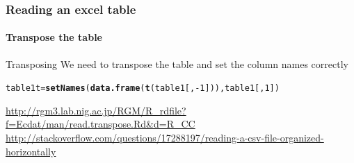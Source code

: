 \documentclass[10pt,handout,english]{beamer}\usepackage[]{graphicx}\usepackage[]{color}
\makeatletter
\newcommand{\hlnum}[1]{\textcolor[rgb]{0.686,0.059,0.569}{#1}}%
\newcommand{\hlopt}[1]{\textcolor[rgb]{0,0,0}{#1}}%
\newcommand{\hlstd}[1]{\textcolor[rgb]{0.345,0.345,0.345}{#1}}%
\newcommand{\hlkwb}[1]{\textcolor[rgb]{0.69,0.353,0.396}{#1}}%
\newcommand{\hlkwd}[1]{\textcolor[rgb]{0.737,0.353,0.396}{\textbf{#1}}}%
\newenvironment{kframe}{%
 \def\at@end@of@kframe{}%
 \ifinner\ifhmode%
  \def\at@end@of@kframe{\end{minipage}}%
  \begin{minipage}{\columnwidth}%
 \fi\fi%
 \def\FrameCommand##1{\hskip\@totalleftmargin \hskip-\fboxsep
 \colorbox{shadecolor}{##1}\hskip-\fboxsep
     \hskip-\linewidth \hskip-\@totalleftmargin \hskip\columnwidth}%
 \MakeFramed {\advance\hsize-\width
   \@totalleftmargin\z@ \linewidth\hsize
   \@setminipage}}%
 {\par\unskip\endMakeFramed%
 \at@end@of@kframe}
\newenvironment{knitrout}{}{} %
\makeatother
\begin{document}
\begin{frame}[fragile]
  \frametitle{Reading an excel table}
  \framesubtitle{Transpose the table}
  \begin{block}{Transposing}
  We need to transpose the table and set the column names correctly
  \end{block}
\begin{knitrout}
\color{fgcolor}\begin{kframe}
\begin{alltt}
\hlstd{table1t}\hlkwb{=}\hlkwd{setNames}\hlstd{(}\hlkwd{data.frame}\hlstd{(}\hlkwd{t}\hlstd{(table1[,}\hlopt{-}\hlnum{1}\hlstd{])),table1[,}\hlnum{1}\hlstd{])}
\end{alltt}
\end{kframe}
\end{knitrout}
\url{http://rgm3.lab.nig.ac.jp/RGM/R_rdfile?f=Ecdat/man/read.transpose.Rd&d=R_CC}
\url{http://stackoverflow.com/questions/17288197/reading-a-csv-file-organized-horizontally}
\end{frame}
\end{document}
